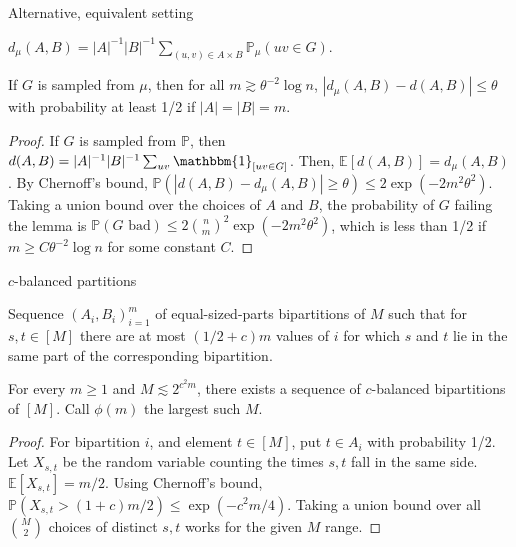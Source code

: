 \documentclass{beamer}
\newcommand{\1}{\mathbbm{1}}
\newcommand{\indicator}[1]{\1_{[#1]}}
\newcommand{\Exp}[1]{\mathbb{E}\left [#1 \right ]}
\newcommand{\Prob}{\mathbb{P}}
\begin{document}
\begin{frame}{Alternative, equivalent setting}
  \begin{definition}
    $d_\mu(A, B) = |A|^{-1} |B|^{-1} \sum_{(u, v) \in A \times B} \Prob_\mu(uv \in G)$.
  \end{definition}

  \pause

  \begin{lemma}
    If $G$ is sampled from $\mu$, then for all $m \gtrsim \theta^{-2} \log n$, $|d_\mu(A,
      B) - d(A, B)| \le \theta$ with probability at least 1/2 if $|A| = |B| = m$.
  \end{lemma}

  \pause

  \begin{proof}
    \pause
    If $G$ is sampled from $\Prob$, then $d(A, B) = |A|^{-1} |B|^{-1} \sum_{uv}
      \indicator{uv \in G}$.
    \pause
    Then, $\Exp{d(A, B)} = d_\mu(A, B)$.
    \pause
    By Chernoff's bound, $\Prob(|d(A, B) - d_\mu(A, B)| \ge \theta) \le 2\exp(-2
      m^2 \theta^2)$.
    \pause
    Taking a union bound over the choices of $A$ and $B$, the probability of $G$
    failing the lemma is $\Prob(G \text{ bad}) \le 2 {n \choose m}^2 \exp(-2 m^2
      \theta^2)$,
    \pause
    which is less than 1/2 if $m \ge C \theta^{-2} \log n$ for some constant $C$.
  \end{proof}
\end{frame}

\begin{frame}{$c$-balanced partitions}
  \begin{definition}
    Sequence $(A_i, B_i)_{i = 1}^m$ of equal-sized-parts bipartitions of $M$ such that
    for $s, t \in [M]$ there are at most $(1/2 + c)m$ values of $i$ for which $s$ and
    $t$ lie in the same part of the corresponding bipartition.
  \end{definition}

  \pause

  \begin{lemma}
    For every $m \ge 1$ and $M \lesssim 2^{c^2 m}$, there exists a sequence of
    $c$-balanced bipartitions of $[M]$. Call $\phi(m)$ the largest such $M$.
  \end{lemma}

  \pause

  \begin{proof}
    \pause
    For bipartition $i$, and element $t \in [M]$, put $t \in A_i$ with probability 1/2.
    \pause
    Let $X_{s, t}$ be the random variable counting the times $s, t$ fall in the same
    side.
    \pause
    $\Exp{X_{s, t}} = m/2$.
    \pause
    Using Chernoff's bound, $\Prob(X_{s, t} > (1 + c)m/2) \le \exp(-c^2 m/4)$.
    \pause
    Taking a union bound over all ${M \choose 2}$ choices of distinct $s, t$ works for
    the given $M$ range.
  \end{proof}
\end{frame}
\end{document}
